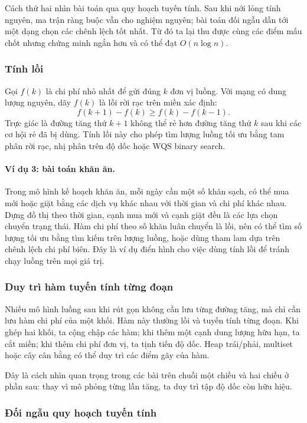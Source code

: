 \documentclass[11pt]{article}
\begin{document}
Cách thứ hai nhìn bài toán qua quy hoạch tuyến tính. Sau khi nới lỏng tính
nguyên, ma trận ràng buộc vẫn cho nghiệm nguyên; bài toán đối ngẫu dẫn tới một
dạng chọn các chênh lệch tốt nhất. Từ đó ta lại thu được cùng các điểm mấu chốt
nhưng chứng minh ngắn hơn và có thể đạt $O(n\log n)$.

\subsubsection{Tính lồi}

Gọi $f(k)$ là chi phí nhỏ nhất để gửi đúng $k$ đơn vị luồng. Với mạng có dung
lượng nguyên, dãy $f(k)$ là lồi rời rạc trên miền xác định:
\[
  f(k+1)-f(k) \ge f(k)-f(k-1).
\]
Trực giác là đường tăng thứ $k+1$ không thể rẻ hơn đường tăng thứ $k$ sau khi
các cơ hội rẻ đã bị dùng. Tính lồi này cho phép tìm lượng luồng tối ưu bằng tam
phân rời rạc, nhị phân trên độ dốc hoặc WQS binary search.

\paragraph{Ví dụ 3: bài toán khăn ăn.}
Trong mô hình kế hoạch khăn ăn, mỗi ngày cần một số khăn sạch, có thể mua mới
hoặc giặt bằng các dịch vụ khác nhau với thời gian và chi phí khác nhau. Dựng
đồ thị theo thời gian, cạnh mua mới và cạnh giặt đều là các lựa chọn chuyển
trạng thái. Hàm chi phí theo số khăn luân chuyển là lồi, nên có thể tìm số
lượng tối ưu bằng tìm kiếm trên lượng luồng, hoặc dùng tham lam dựa trên chênh
lệch chi phí biên. Đây là ví dụ điển hình cho việc dùng tính lồi để tránh chạy
luồng trên mọi giá trị.

\subsubsection{Duy trì hàm tuyến tính từng đoạn}

Nhiều mô hình luồng sau khi rút gọn không cần lưu từng đường tăng, mà chỉ cần
lưu hàm chi phí của một khối. Hàm này thường lồi và tuyến tính từng đoạn. Khi
ghép hai khối, ta cộng chập các hàm; khi thêm một cạnh dung lượng hữu hạn, ta
cắt miền; khi thêm chi phí đơn vị, ta tịnh tiến độ dốc. Heap trái/phải,
multiset hoặc cây cân bằng có thể duy trì các điểm gãy của hàm.

Đây là cách nhìn quan trọng trong các bài trên chuỗi một chiều và hai chiều ở
phần sau: thay vì mô phỏng từng lần tăng, ta duy trì tập độ dốc còn hữu hiệu.

\subsubsection{Đối ngẫu quy hoạch tuyến tính}
\end{document}
